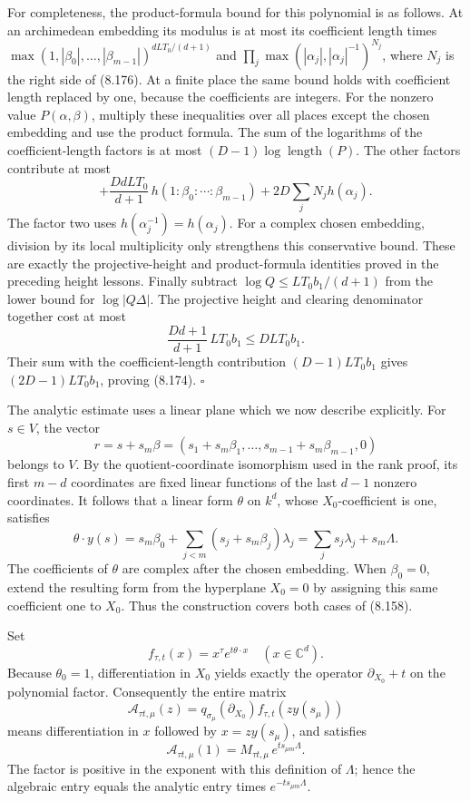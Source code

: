 \documentclass[
  11pt,
  a4paper,
]{article}
\begin{document}
For completeness, the product-formula bound for this polynomial is as
follows. At an archimedean embedding its modulus is at most its
coefficient length times
\(\max(1,|\beta_0|,\ldots,|\beta_{m-1}|)^{dLT_0/(d+1)}\) and
\(\prod_j\max(|\alpha_j|,|\alpha_j|^{-1})^{N_j}\), where \(N_j\) is the
right side of (8.176). At a finite place the same bound holds with
coefficient length replaced by one, because the coefficients are
integers. For the nonzero value \(P(\alpha,\beta)\), multiply these
inequalities over all places except the chosen embedding and use the
product formula. The sum of the logarithms of the coefficient-length
factors is at most \((D-1)\log\operatorname{length}(P)\). The other
factors contribute at most \[
+\frac{DdLT_0}{d+1}\,h(1:\beta_0:\cdots:\beta_{m-1})
+2D\sum_jN_jh(\alpha_j).
\] The factor two uses \(h(\alpha_j^{-1})=h(\alpha_j)\). For a complex
chosen embedding, division by its local multiplicity only strengthens
this conservative bound. These are exactly the projective-height and
product-formula identities proved in the preceding height lessons.
Finally subtract \(\log Q\le LT_0b_1/(d+1)\) from the lower bound for
\(\log|Q\Delta|\). The projective height and clearing denominator
together cost at most \[
\frac{Dd+1}{d+1}\,LT_0b_1\le DLT_0b_1.
\] Their sum with the coefficient-length contribution \((D-1)LT_0b_1\)
gives \((2D-1)LT_0b_1\), proving (8.174). \(\square\)

The analytic estimate uses a linear plane which we now describe
explicitly. For \(s\in V\), the vector \[
r=s+s_m\beta=(s_1+s_m\beta_1,\ldots,s_{m-1}+s_m\beta_{m-1},0)
\] belongs to \(V\). By the quotient-coordinate isomorphism used in the
rank proof, its first \(m-d\) coordinates are fixed linear functions of
the last \(d-1\) nonzero coordinates. It follows that a linear form
\(\theta\) on \(k^d\), whose \(X_0\)-coefficient is one, satisfies \[
\theta\cdot y(s)
=s_m\beta_0+\sum_{j<m}(s_j+s_m\beta_j)\lambda_j
=\sum_j s_j\lambda_j+s_m\Lambda.
\tag{8.177}
\] The coefficients of \(\theta\) are complex after the chosen
embedding. When \(\beta_0=0\), extend the resulting form from the
hyperplane \(X_0=0\) by assigning this same coefficient one to \(X_0\).
Thus the construction covers both cases of (8.158).

Set \[
f_{\tau,t}(x)=x^\tau e^{t\theta\cdot x}\quad(x\in\mathbb C^d).
\] Because \(\theta_0=1\), differentiation in \(X_0\) yields exactly the
operator \(\partial_{X_0}+t\) on the polynomial factor. Consequently the
entire matrix \[
\mathcal A_{\tau t,\mu}(z)
=q_{\sigma_\mu}(\partial_{X_0})
f_{\tau,t}(zy(s_\mu))
\] means differentiation in \(x\) followed by \(x=zy(s_\mu)\), and
satisfies \[
\mathcal A_{\tau t,\mu}(1)
=M_{\tau t,\mu}\,e^{ts_{\mu m}\Lambda}.
\tag{8.178}
\] The factor is positive in the exponent with this definition of
\(\Lambda\); hence the algebraic entry equals the analytic entry times
\(e^{-ts_{\mu m}\Lambda}\).
\end{document}
